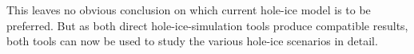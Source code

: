 This leaves no obvious conclusion on which current hole-ice model is to be preferred. But as both direct hole-ice-simulation tools produce compatible results, both tools can now be used to study the various hole-ice scenarios in detail.

\begin{table}[p]
  \begin{center}
  \end{center}

\end{table}
